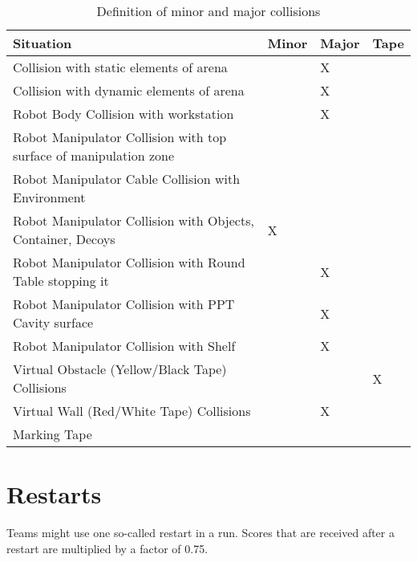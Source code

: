 \begin{table}[h!]
	\caption{Definition of minor and major collisions}
	\label{tab:collisions}
	\centering
	\begin{tabular}{|l|p{1cm}|p{1cm}|p{1.5cm}|}
		\hline
		Situation                                                & Minor & Major &  Tape \\
		\hline
		Collision with static elements of arena                  &       & X     &              \\
		Collision with dynamic elements of arena                 &       & X     &              \\
		Robot Body Collision with workstation                    &       & X     &              \\
		Robot Manipulator Collision with top surface of manipulation zone       &       &       &              \\
		Robot Manipulator Cable Collision with Environment      &       &       &              \\
		Robot Manipulator Collision with Objects, Container, Decoys & X     &       &              \\
		Robot Manipulator Collision with Round Table stopping it &      & X      &              \\
		Robot Manipulator Collision with PPT Cavity surface      &      & X      &              \\
		Robot Manipulator Collision with Shelf                   &      & X      &              \\
		Virtual Obstacle (Yellow/Black Tape) Collisions          &       &       & X            \\
		Virtual Wall (Red/White Tape) Collisions                 &       & X     &              \\
		Marking Tape & & & \\
		\hline
	\end{tabular}
\end{table}


\section{Restarts}
Teams might use one so-called restart in a run. Scores that are received after a restart are multiplied by a factor of 0.75.

